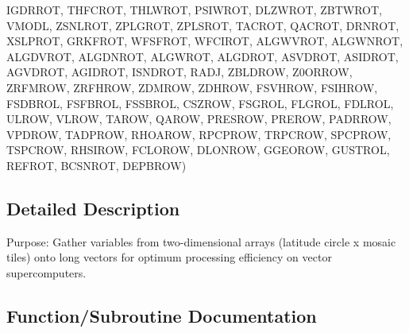 \begin{DoxyCompactItemize}
I\+G\+D\+R\+R\+O\+T, T\+H\+F\+C\+R\+O\+T, T\+H\+L\+W\+R\+O\+T, P\+S\+I\+W\+R\+O\+T, D\+L\+Z\+W\+R\+O\+T, Z\+B\+T\+W\+R\+O\+T, V\+M\+O\+D\+L, Z\+S\+N\+L\+R\+O\+T, Z\+P\+L\+G\+R\+O\+T, Z\+P\+L\+S\+R\+O\+T, T\+A\+C\+R\+O\+T, Q\+A\+C\+R\+O\+T, D\+R\+N\+R\+O\+T, X\+S\+L\+P\+R\+O\+T, G\+R\+K\+F\+R\+O\+T, W\+F\+S\+F\+R\+O\+T, W\+F\+C\+I\+R\+O\+T, A\+L\+G\+W\+V\+R\+O\+T, A\+L\+G\+W\+N\+R\+O\+T, A\+L\+G\+D\+V\+R\+O\+T, A\+L\+G\+D\+N\+R\+O\+T, A\+L\+G\+W\+R\+O\+T, A\+L\+G\+D\+R\+O\+T, A\+S\+V\+D\+R\+O\+T, A\+S\+I\+D\+R\+O\+T, A\+G\+V\+D\+R\+O\+T, A\+G\+I\+D\+R\+O\+T, I\+S\+N\+D\+R\+O\+T, R\+A\+D\+J, Z\+B\+L\+D\+R\+O\+W, Z0\+O\+R\+R\+O\+W, Z\+R\+F\+M\+R\+O\+W, Z\+R\+F\+H\+R\+O\+W, Z\+D\+M\+R\+O\+W, Z\+D\+H\+R\+O\+W, F\+S\+V\+H\+R\+O\+W, F\+S\+I\+H\+R\+O\+W, F\+S\+D\+B\+R\+O\+L, F\+S\+F\+B\+R\+O\+L, F\+S\+S\+B\+R\+O\+L, C\+S\+Z\+R\+O\+W, F\+S\+G\+R\+O\+L, F\+L\+G\+R\+O\+L, F\+D\+L\+R\+O\+L, U\+L\+R\+O\+W, V\+L\+R\+O\+W, T\+A\+R\+O\+W, Q\+A\+R\+O\+W, P\+R\+E\+S\+R\+O\+W, P\+R\+E\+R\+O\+W, P\+A\+D\+R\+R\+O\+W, V\+P\+D\+R\+O\+W, T\+A\+D\+P\+R\+O\+W, R\+H\+O\+A\+R\+O\+W, R\+P\+C\+P\+R\+O\+W, T\+R\+P\+C\+R\+O\+W, S\+P\+C\+P\+R\+O\+W, T\+S\+P\+C\+R\+O\+W, R\+H\+S\+I\+R\+O\+W, F\+C\+L\+O\+R\+O\+W, D\+L\+O\+N\+R\+O\+W, G\+G\+E\+O\+R\+O\+W, G\+U\+S\+T\+R\+O\+L, R\+E\+F\+R\+O\+T, B\+C\+S\+N\+R\+O\+T, D\+E\+P\+B\+R\+O\+W)
\end{DoxyCompactItemize}


\subsection{Detailed Description}
Purpose\+: Gather variables from two-\/dimensional arrays (latitude circle x mosaic tiles) onto long vectors for optimum processing efficiency on vector supercomputers. 



\subsection{Function/\+Subroutine Documentation}
\hypertarget{CLASSG_8f_aba1f0c497e451788b07234733ce424e5}{}
